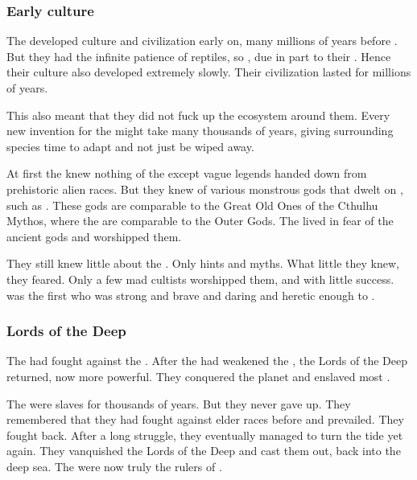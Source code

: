 \subsubsection{Early \ophidian culture}
The \ophidians developed culture and civilization early on, many millions of years before \Tiamat. 
But they had the infinite patience of reptiles, so , due in part to their .
Hence their culture also developed extremely slowly. 
Their civilization lasted for millions of years. 

This also meant that they did not fuck up the ecosystem around them. 
Every new invention for the \ophidians{} might take many thousands of years, giving surrounding species time to adapt and not just be wiped away. 

At first the \ophidians knew nothing of the \xss except vague legends handed down from prehistoric alien races. 
But they knew of various monstrous gods that dwelt on \Miith, such as \Ubloth. 
These \Miithian gods are comparable to the Great Old Ones of the Cthulhu Mythos, where the \xss are comparable to the Outer Gods. 
The \ophidians lived in fear of the ancient gods and worshipped them. 

They still knew little about the \xss. 
Only hints and myths.
What little they knew, they feared.
Only a few mad cultists worshipped them, and with little success.
\Sethicus was the first who was strong and brave and daring and heretic enough to . 





\subsubsection{Lords of the Deep}
The  had fought against the \moonthings. 
After the \ophidians had weakened the \moonthings, the Lords of the Deep returned, now more powerful. 
They conquered the planet and enslaved most \ophidians. 

The \ophidians were slaves for thousands of years. 
But they never gave up.
They remembered that they had fought against elder races before and prevailed. 
They fought back. 
After a long struggle, they eventually managed to turn the tide yet again. 
They vanquished the Lords of the Deep and cast them out, back into the deep sea. 
The \ophidians were now truly the rulers of \Miith. 





